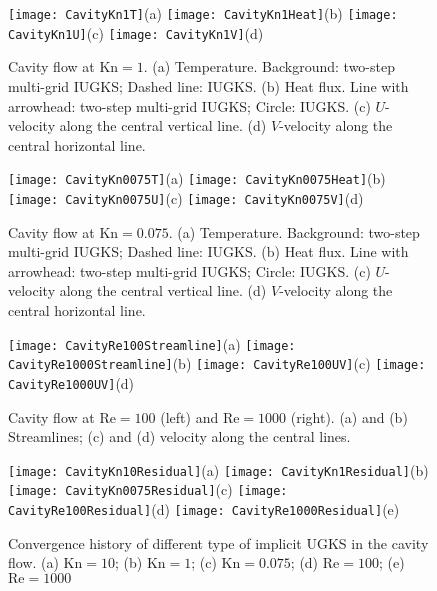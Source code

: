 \documentclass[3p,12pt]{elsarticle}
\begin{document}
	\begin{figure}
		\centering
		\texttt{[image: CavityKn1T]}{(a)}
		\texttt{[image: CavityKn1Heat]}{(b)}
		\texttt{[image: CavityKn1U]}{(c)}
		\texttt{[image: CavityKn1V]}{(d)}
		\caption{Cavity flow at $\mathrm{Kn} = 1$. (a) Temperature. Background: two-step multi-grid IUGKS; Dashed line: IUGKS. (b) Heat flux. Line with arrowhead: two-step multi-grid IUGKS; Circle: IUGKS. (c) $U$-velocity along the central vertical line. (d) $V$-velocity along the central horizontal line.}
		\label{Kn1}
	\end{figure}
	
	\begin{figure}
		\centering
		\texttt{[image: CavityKn0075T]}{(a)}
		\texttt{[image: CavityKn0075Heat]}{(b)}
		\texttt{[image: CavityKn0075U]}{(c)}
		\texttt{[image: CavityKn0075V]}{(d)}
		\caption{Cavity flow at $\mathrm{Kn} = 0.075$. (a) Temperature. Background: two-step multi-grid IUGKS; Dashed line: IUGKS. (b) Heat flux. Line with arrowhead: two-step multi-grid IUGKS; Circle: IUGKS. (c) $U$-velocity along the central vertical line. (d) $V$-velocity along the central horizontal line.}
		\label{Kn0075}
	\end{figure}
	
	\begin{figure}
		\centering
		\texttt{[image: CavityRe100Streamline]}{(a)}
		\texttt{[image: CavityRe1000Streamline]}{(b)}
		\texttt{[image: CavityRe100UV]}{(c)}
		\texttt{[image: CavityRe1000UV]}{(d)}
		\caption{Cavity flow at $\mathrm{Re} = 100$ (left) and $\mathrm{Re} = 1000$ (right). (a) and (b) Streamlines; (c) and (d) velocity along the central lines.}
		\label{Continnum}
	\end{figure}
	
	
	\begin{figure}
		\centering
		\texttt{[image: CavityKn10Residual]}{(a)}
		\texttt{[image: CavityKn1Residual]}{(b)}
		\texttt{[image: CavityKn0075Residual]}{(c)}
		\texttt{[image: CavityRe100Residual]}{(d)}
		\texttt{[image: CavityRe1000Residual]}{(e)}
		\caption{Convergence history of different type of implicit UGKS in the cavity flow. (a) $\mathrm{Kn} = 10$; (b) $\mathrm{Kn} = 1$; (c) $\mathrm{Kn} = 0.075$; (d) $\mathrm{Re} = 100$; (e) $\mathrm{Re} = 1000$}
		\label{ContinnumResidual}
	\end{figure}
	
\end{document}
